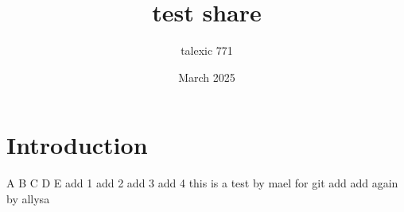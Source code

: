 \documentclass{article}
\title{test share}
\author{talexic 771 }
\date{March 2025}
\begin{document}
\maketitle

\section{Introduction}
A
B
C
D
E
add 1
add 2
add 3
add 4
this is a test by mael for git
add
add again by allysa
\end{document}
